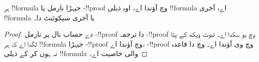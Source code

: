 \documentclass[../../../include/open-logic-section]{subfiles}
\begin{document}
\begin{cor}
ہر !!{formula} جیہڑا نارمل  یا -!!{proof} وچ آؤندا اے، اوہ ذیلی !!{formula} اے، آخری !!{formula} یا آخری سیکوئنٹ دا۔
\end{cor}

\begin{proof}
 دے حساب نال ہر نارمل -!!{proof} دا ترجمہ -!!{proof} وچ ہو سکدا اے۔ ثبوت ویکھ کے پتا لگدا اے کہ ہر !!{formula} جیہڑا -!!{proof} وچ آؤندا اے، -!!{proof} وچ وی آؤندا اے۔  وچ \Cut{} دا قاعدہ نہ ہون کر کے ذیلی !!{formula} والی خاصیت اے۔
\end{proof}
\end{document}
